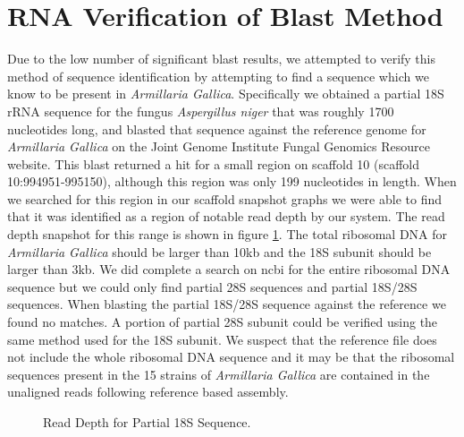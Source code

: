 \documentclass[12pt]{article}
\begin{document}
%
%
\vspace{-0.5cm}
\section{RNA Verification of Blast Method}
\vspace{-0.5cm}
	Due to the low number of significant blast results, we attempted to verify this method of sequence identification by attempting to find a sequence which we know to be present in \textit{Armillaria Gallica}. Specifically we obtained a partial 18S rRNA sequence for the fungus \textit{Aspergillus niger} that was roughly 1700 nucleotides long, and blasted that sequence against the reference genome for \textit{Armillaria Gallica} on the Joint Genome Institute Fungal Genomics Resource website. This blast returned a hit for a small region on scaffold 10 (scaffold 10:994951-995150), although this region was only 199 nucleotides in length. When we searched for this region in our scaffold snapshot graphs we were able to find that it was identified as a region of notable read depth by our system. The read depth snapshot for this range is shown in figure \ref{rdsnp18Srrna}. The total ribosomal DNA for \textit{Armillaria Gallica} should be larger than 10kb and the 18S subunit should be larger than 3kb. We did complete a search on ncbi for the entire ribosomal DNA sequence but we could only find partial 28S sequences and partial 18S/28S sequences. When blasting the partial 18S/28S sequence against the reference we found no matches. A portion of partial 28S subunit could be verified using the same method used for the 18S subunit. We suspect that the reference file does not include the whole ribosomal DNA sequence and it may be that the ribosomal sequences present in the 15 strains of \textit{Armillaria Gallica} are contained in the unaligned reads following reference based assembly. 
      \begin{figure}[H]
	\begin{centering}
 		\begin{singlespace}
			\vspace{-0.5cm}
			\caption[Read Depth for Partial 18S Sequence.]{Read Depth for Partial 18S Sequence.}\label{rdsnp18Srrna}
		\end{singlespace}
	\end{centering}
\end{figure}
%
%
\vspace{-1cm}
\end{document}
